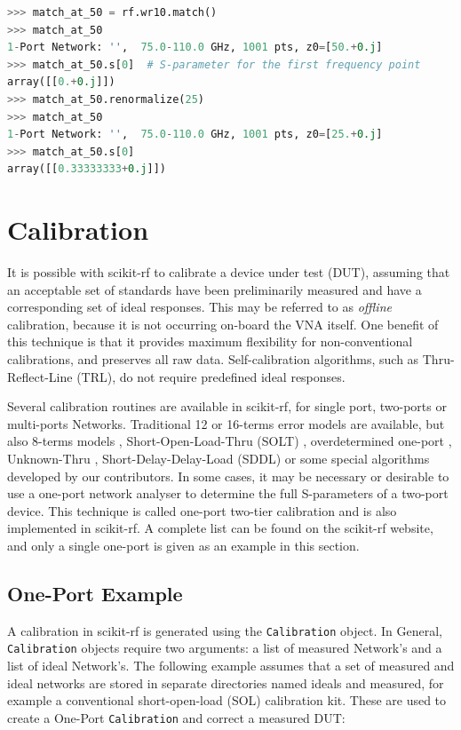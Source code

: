 \documentclass{IEEEjmw}
\begin{document}
\begin{lstlisting}[language=Python]
>>> match_at_50 = rf.wr10.match()
>>> match_at_50
1-Port Network: '',  75.0-110.0 GHz, 1001 pts, z0=[50.+0.j]
>>> match_at_50.s[0]  # S-parameter for the first frequency point
array([[0.+0.j]])
>>> match_at_50.renormalize(25)
>>> match_at_50
1-Port Network: '',  75.0-110.0 GHz, 1001 pts, z0=[25.+0.j]
>>> match_at_50.s[0]
array([[0.33333333+0.j]])
\end{lstlisting}

\section{Calibration}
It is possible with scikit-rf to calibrate a device under test (DUT), assuming that an acceptable set of standards have been preliminarily measured and have a corresponding set of ideal responses. This may be referred to as \textit{offline} calibration, because it is not occurring on-board the VNA itself. One benefit of this technique is that it provides maximum flexibility for non-conventional calibrations, and preserves all raw data. Self-calibration algorithms, such as Thru-Reflect-Line (TRL)\cite{engen1979}, do not require predefined ideal responses.

Several calibration routines are available in scikit-rf, for single port, two-ports or multi-ports Networks. Traditional 12 \cite{marks1997} or 16-terms \cite{silvonen1993} error models are available, but also 8-terms models \cite{speciale1977}, Short-Open-Load-Thru (SOLT) \cite{kruppa1971}, overdetermined one-port \cite{bauer1974}, Unknown-Thru \cite{ferrero1992}, Short-Delay-Delay-Load (SDDL) \cite{liu2006} or some special algorithms developed by our contributors. In some cases, it may be necessary or desirable to use a one-port network analyser to determine the full S-parameters of a two-port device. This technique is called one-port two-tier calibration \cite{ou2005} and is also implemented in scikit-rf. A complete list can be found on the scikit-rf website, and only a single one-port is given as an example in this section.

\subsection{One-Port Example}
A calibration in scikit-rf is generated using the \texttt{Calibration} object. In General, \texttt{Calibration} objects require two arguments: a list of measured Network’s and a list of ideal Network’s. The following example assumes that a set of measured and ideal networks are stored in separate directories named ideals and measured, for example a conventional short-open-load (SOL) calibration kit. These are used to create a One-Port \texttt{Calibration} and correct a measured DUT:
\end{document}
